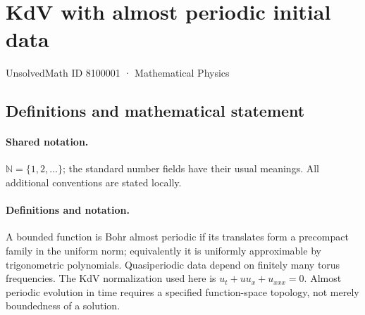 \documentclass[11pt]{article}
\begin{document}
\setcounter{section}{8100000}
\section{KdV with almost periodic initial data}\label{8100001}
{\small UnsolvedMath ID 8100001 · Mathematical Physics}
\subsection{Definitions and mathematical statement}

\paragraph{Shared notation.}$\mathbb N=\{1,2,\ldots\}$; the standard number fields have their usual meanings. All additional conventions are stated locally.


\paragraph{Definitions and notation.}A bounded function is Bohr almost periodic if its translates form a precompact family in the uniform norm; equivalently it is uniformly approximable by trigonometric polynomials. Quasiperiodic data depend on finitely many torus frequencies. The KdV normalization used here is $u_t+uu_x+u_{xxx}=0$. Almost periodic evolution in time requires a specified function-space topology, not merely boundedness of a solution.
\end{document}
